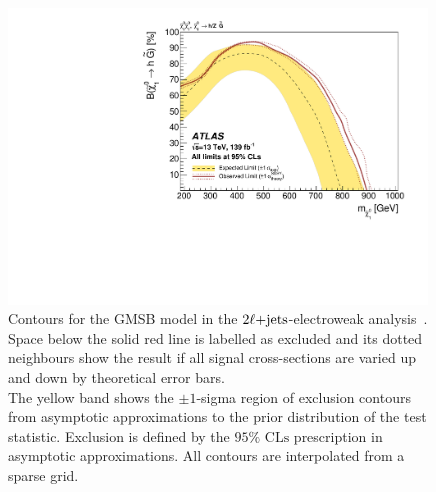\begin{figure}[tp]
\centering
\includegraphics[width=0.99\textwidth]{figures/2ljets_contours_gmsb.pdf}
\caption{%
Contours for the GMSB model in the $2\ell\mathrm{+jets}$-electroweak
analysis~\cite{atlas2022searches}.
\\[0.5em]
Space below the solid red line is labelled as excluded and its dotted
neighbours show the result if all signal cross-sections are varied up and down
by theoretical error bars.
\\[0.5em]
The yellow band shows the $\pm1$-sigma region of exclusion contours
from asymptotic approximations to the prior distribution of the test statistic.
Exclusion is defined by the $95\%$ $\mathrm{CLs}$ prescription
in asymptotic approximations.
All contours are interpolated from a sparse grid.
}
\label{fig:2ljets_contours_gmsb}
\end{figure}


